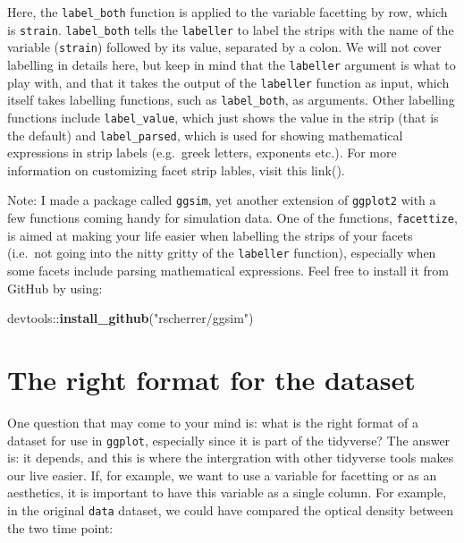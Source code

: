 \documentclass[]{book}
\newenvironment{Shaded}{}{}
\newcommand{\KeywordTok}[1]{\textcolor[rgb]{0.00,0.44,0.13}{\textbf{#1}}}
\newcommand{\NormalTok}[1]{#1}
\newcommand{\OperatorTok}[1]{\textcolor[rgb]{0.40,0.40,0.40}{#1}}
\newcommand{\StringTok}[1]{\textcolor[rgb]{0.25,0.44,0.63}{#1}}
\begin{document}
Here, the \texttt{label\_both} function is applied to the variable facetting by row, which is \texttt{strain}. \texttt{label\_both} tells the \texttt{labeller} to label the strips with the name of the variable (\texttt{strain}) followed by its value, separated by a colon. We will not cover labelling in details here, but keep in mind that the \texttt{labeller} argument is what to play with, and that it takes the output of the \texttt{labeller} function as input, which itself takes labelling functions, such as \texttt{label\_both}, as arguments. Other labelling functions include \texttt{label\_value}, which just shows the value in the strip (that is the default) and \texttt{label\_parsed}, which is used for showing mathematical expressions in strip labels (e.g.~greek letters, exponents etc.). For more information on customizing facet strip lables, visit this link().

Note: I made a package called \texttt{ggsim}, yet another extension of \texttt{ggplot2} with a few functions coming handy for simulation data. One of the functions, \texttt{facettize}, is aimed at making your life easier when labelling the strips of your facets (i.e.~not going into the nitty gritty of the \texttt{labeller} function), especially when some facets include parsing mathematical expressions. Feel free to install it from GitHub by using:

\begin{Shaded}
\begin{Highlighting}[]
\NormalTok{devtools}\OperatorTok{::}\KeywordTok{install_github}\NormalTok{(}\StringTok{"rscherrer/ggsim"}\NormalTok{)}
\end{Highlighting}
\end{Shaded}

\hypertarget{the-right-format-for-the-dataset}{%
\section{The right format for the dataset}\label{the-right-format-for-the-dataset}}

One question that may come to your mind is: what is the right format of a dataset for use in \texttt{ggplot}, especially since it is part of the tidyverse? The answer is: it depends, and this is where the intergration with other tidyverse tools makes our live easier. If, for example, we want to use a variable for facetting or as an aesthetics, it is important to have this variable as a single column. For example, in the original \texttt{data} dataset, we could have compared the optical density between the two time point:
\end{document}
